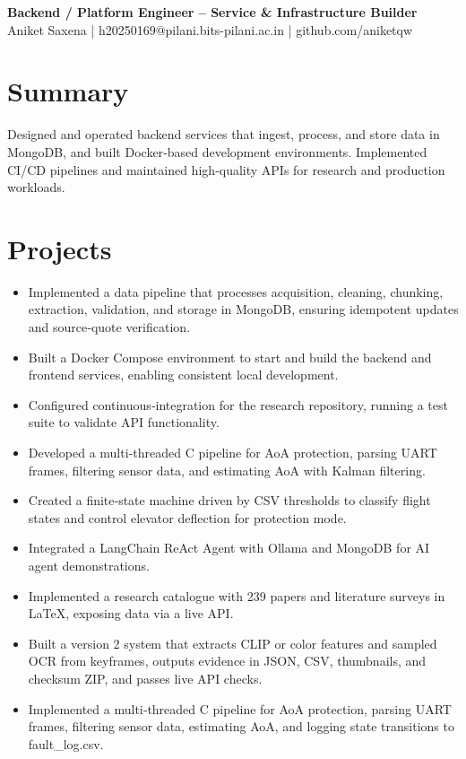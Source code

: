 \documentclass[11pt,a4paper]{article}
\begin{document}
\begin{center}{\LARGE\bfseries Backend / Platform Engineer – Service \& Infrastructure Builder}\\[4pt]
Aniket Saxena | h20250169@pilani.bits-pilani.ac.in | github.com/aniketqw\end{center}

\section*{Summary}
Designed and operated backend services that ingest, process, and store data in MongoDB, and built Docker‑based development environments. Implemented CI/CD pipelines and maintained high‑quality APIs for research and production workloads.

\section*{Projects}
\begin{itemize}
  \item Implemented a data pipeline that processes acquisition, cleaning, chunking, extraction, validation, and storage in MongoDB, ensuring idempotent updates and source‑quote verification.
  \item Built a Docker Compose environment to start and build the backend and frontend services, enabling consistent local development.
  \item Configured continuous‑integration for the research repository, running a test suite to validate API functionality.
  \item Developed a multi‑threaded C pipeline for AoA protection, parsing UART frames, filtering sensor data, and estimating AoA with Kalman filtering.
  \item Created a finite‑state machine driven by CSV thresholds to classify flight states and control elevator deflection for protection mode.
  \item Integrated a LangChain ReAct Agent with Ollama and MongoDB for AI agent demonstrations.
  \item Implemented a research catalogue with 239 papers and literature surveys in LaTeX, exposing data via a live API.
  \item Built a version 2 system that extracts CLIP or color features and sampled OCR from keyframes, outputs evidence in JSON, CSV, thumbnails, and checksum ZIP, and passes live API checks.
  \item Implemented a multi‑threaded C pipeline for AoA protection, parsing UART frames, filtering sensor data, estimating AoA, and logging state transitions to fault\_log.csv.
\end{itemize}
\end{document}
